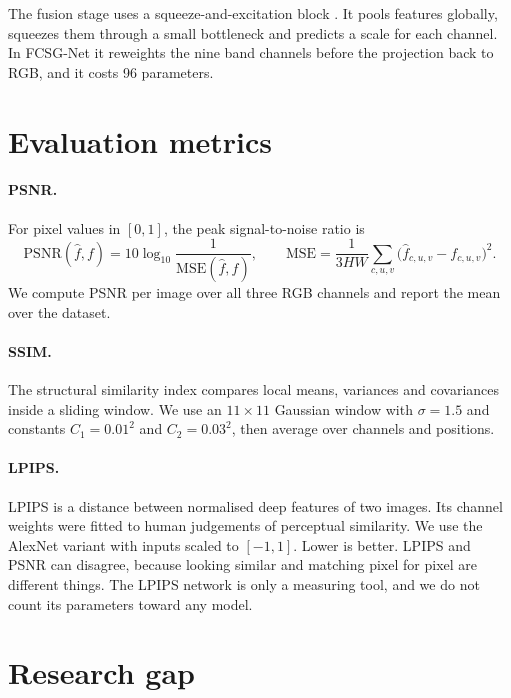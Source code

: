 \documentclass[12pt,a4paper,oneside]{NITR}
\newcommand{\fcsg}{FCSG-Net}
\begin{document}
The fusion stage uses a squeeze-and-excitation block \cite{hu2018se}. It pools
features globally, squeezes them through a small bottleneck and predicts a
scale for each channel. In \fcsg{} it reweights the nine band channels before
the projection back to RGB, and it costs 96 parameters.

\section{Evaluation metrics}\label{sec:lit-metrics}

\paragraph{PSNR.} For pixel values in $[0,1]$, the peak signal-to-noise
ratio is
\begin{equation}
	\mathrm{PSNR}(\hat f, f) = 10\log_{10}\frac{1}{\mathrm{MSE}(\hat f, f)},
	\qquad
	\mathrm{MSE} = \frac{1}{3HW}\sum_{c,u,v}\big(\hat f_{c,u,v} - f_{c,u,v}\big)^2 .
	\label{eq:psnr}
\end{equation}
We compute PSNR per image over all three RGB channels and report the mean
over the dataset.

\paragraph{SSIM.} The structural similarity index \cite{wang2004ssim}
compares local means, variances and covariances inside a sliding window. We
use an $11\times11$ Gaussian window with $\sigma=1.5$ and constants
$C_1=0.01^2$ and $C_2=0.03^2$, then average over channels and positions.

\paragraph{LPIPS.} LPIPS \cite{zhang2018lpips} is a distance between
normalised deep features of two images. Its channel weights were fitted to
human judgements of perceptual similarity. We use the AlexNet variant with
inputs scaled to $[-1,1]$. Lower is better. LPIPS and PSNR can disagree,
because looking similar and matching pixel for pixel are different things.
The LPIPS network is only a measuring tool, and we do not count its
parameters toward any model.

\section{Research gap}\label{sec:gap}
\end{document}
